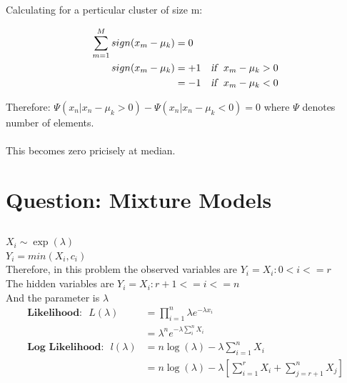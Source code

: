 \documentclass[paper=a4, fontsize=11pt]{scrartcl} %
\numberwithin{equation}{section} %
\numberwithin{figure}{section} %
\numberwithin{table}{section} %
\begin{document}
Calculating for a perticular cluster of size m:

\begin{align*}
\sum_{m=1}^{M} sign(x_{m} - \mu_{k}) &= 0\\
sign(x_{m} - \mu_{k}) &= +1 ~~~\textsl{if}~~ x_{m} - \mu_{k}>0\\
&= -1 ~~~\textsl{if}~~ x_{m} - \mu_{k}<0\\
\end{align*}

Therefore: $\Psi(x_{n}|x_{n} - \mu_{k}>0) - \Psi(x_{n}|x_{n} - \mu_{k}<0) = 0$ where $\Psi$ denotes number of elements.\\\\
This becomes zero pricisely at median.

\section{Question: Mixture Models}
\subsection{}
$X_{i} \sim \exp(\lambda)$\\
$Y_{i} = min(X_{i},c_{i})$\\

Therefore, in this problem the observed variables are $Y_{i}=X_{i} : 0<i<=r$ \\
The hidden variables are $Y_{i}=X_{i} : r+1<= i <=n$ \\
And the parameter is $\lambda$\\


\begin{align*}
\textbf{Likelihood:}~~~ L(\lambda) &= \prod_{i=1}^{n} \lambda e^{-\lambda x_{i}}\\
&= \lambda^{n} e^{-\lambda \sum_{i}^{n}X_{i}}\\
\textbf{Log Likelihood:}~~~ l(\lambda) &= n\log(\lambda) - \lambda \sum_{i=1}^{n}X_{i}\\
&= n\log(\lambda) - \lambda [\sum_{i=1}^{r}X_{i} + \sum_{j=r+1}^{n}X_{j}]
\end{align*}
\end{document}
